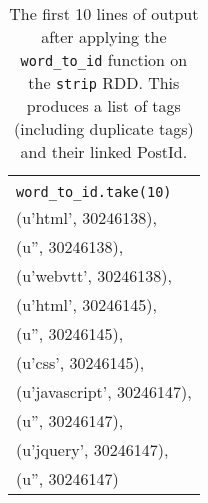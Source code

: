 \documentclass[]{article}
\newcommand{\code}[1]{\colorbox{light-gray}{\texttt{#1}}}
\begin{document}
\begin{table}[!ht]
	\begin{center}
		\caption{The first 10 lines of output after applying the \code{word\_to\_id} function on the \code{strip} RDD.  This produces a list of tags (including duplicate tags) and their linked PostId.}
		\label{tab:table1}
		\begin{tabular}{|l|} 
			\hline
			\\
			\code{word\_to\_id.take(10)}\\
			\hline
			(u'html', 30246138),\\
			(u'', 30246138),\\
			(u'webvtt', 30246138),\\
			(u'html', 30246145),\\
			(u'', 30246145),\\
			(u'css', 30246145),\\
			(u'javascript', 30246147),\\
			(u'', 30246147),\\
			(u'jquery', 30246147),\\
			(u'', 30246147)\\
			\hline
		\end{tabular}
	\end{center}
\end{table}
\end{document}
